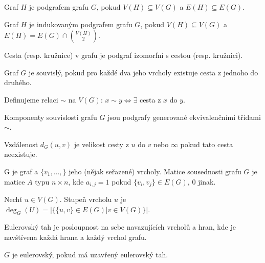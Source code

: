 \documentclass[12pt]{article}					%
\begin{document}
    \begin{definice}
        Graf $H$ je podgrafem grafu $G$, pokud $V(H) \subseteq V(G)$ a $E(H) \subseteq E(G)$.

        Graf $H$ je indukovaným podgrafem grafu $G$, pokud $V(H) \subseteq V(G)$ a $E(H) = E(G) \cap \binom{V(H)}{2}$.
    \end{definice}

    \begin{definice}
        Cesta (resp. kružnice) v grafu je podgraf izomorfní s cestou (resp. kružnici).
    \end{definice}

    \begin{definice}
        Graf $G$ je souvislý, pokud pro každé dva jeho vrcholy existuje cesta z jednoho do druhého.

        Definujeme relaci $\sim$ na $V(G)$: $x \sim y \Leftrightarrow \exists$ cesta z $x$ do $y$.

        Komponenty souvislosti grafu $G$ jsou podgrafy generované ekvivalenčními třídami $\sim$.

        Vzdálenost $d_G(u, v)$ je velikost cesty z $u$ do $v$ nebo $∞$ pokud tato cesta neexistuje.
    \end{definice}

    \begin{definice}
        G je graf a $\{v_1, …, \}$ jeho (nějak seřazené) vrcholy. Matice sousednosti grafu $G$ je matice $A$ typu $n\times n$, kde $a_{i, j} = 1$ pokud $\{v_i, v_j\} \in E(G)$, 0 jinak.
    \end{definice}

    \begin{definice}
        Nechť $u \in V(G)$. Stupeň vrcholu $u$ je $\deg_G(U) = \left| \{ \{u, v\} \in E(G) | v \in V(G) \} \right|$.
    \end{definice}

    \begin{definice}
        Eulerovský tah je posloupnost na sebe navazujících vrcholů a hran, kde je navštívena každá hrana a každý vrchol grafu.

        $G$ je eulerovský, pokud má uzavřený eulerovský tah.
    \end{definice}
\end{document}
